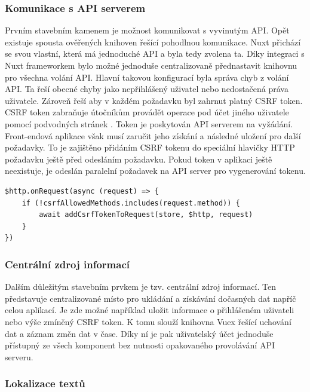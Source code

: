 		\subsubsection{Komunikace s API serverem}

		Prvním stavebním kamenem je možnost komunikovat s vyvinutým \ac{API}.
		Opět existuje spousta ověřených knihoven řešící pohodlnou komunikace.
		Nuxt přichází se svou vlastní, která má jednoduché \ac{API} a byla tedy zvolena ta.
		Díky integraci s Nuxt frameworkem bylo možné jednoduše centralizovaně přednastavit knihovnu pro všechna volání \ac{API}.
		Hlavní takovou konfigurací byla správa chyb z volání \ac{API}.
		Ta řeší obecné chyby jako nepřihlášený uživatel nebo nedostačená práva uživatele.
		Zároveň řeší aby v každém požadavku byl zahrnut platný \noindent\ac{CSRF} token.
		\ac{CSRF} token zabraňuje útočníkům provádět operace pod účet jiného uživatele pomocí podvodných stránek \cite{csrf}.
		Token je poskytován \ac{API} serverem na vyžádání.
		Front-endová aplikace však musí zaručit jeho získání a následné uložení pro další požadavky.
		To je zajištěno přidáním \ac{CSRF} tokenu do speciální hlavičky \ac{HTTP} požadavku ještě před odesláním požadavku.
		Pokud token v aplikaci ještě neexistuje, je odeslán paralelní požadavek na \ac{API} server pro vygenerování tokenu.

		\begin{lstlisting}[caption={Ukázka vložení CSRF tokenu do každého požadavku putujícího na API server. Zdroj: [autor]}]
$http.onRequest(async (request) => {
	if (!csrfAllowedMethods.includes(request.method)) {
		await addCsrfTokenToRequest(store, $http, request)
	}
})
		\end{lstlisting}

		\subsubsection{Centrální zdroj informací}

		Dalším důležitým stavebním prvkem je tzv. centrální zdroj informací.
		Ten představuje centralizované místo pro ukládání a získávání dočasných dat napříč celou aplikací.
		Je zde možné například uložit informace o přihlášeném uživateli nebo výše zmíněný \ac{CSRF} token.
		K tomu slouží knihovna Vuex řešící uchování dat a záznam změn dat v čase.
		Díky ní je pak uživatelský účet jednoduše přístupný ze všech komponent bez nutnosti opakovaného provolávání
		\ac{API} serveru.

		\subsubsection{Lokalizace textů}

